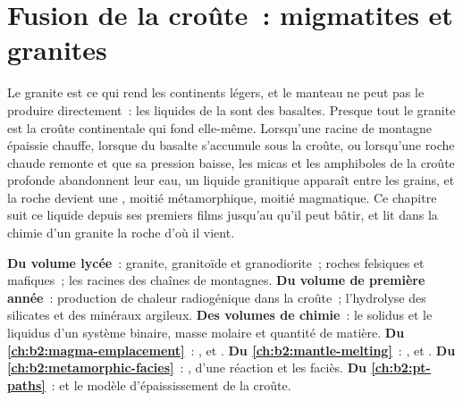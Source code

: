 \chapter{Fusion de la croûte~: migmatites et granites}\label{ch:b2:crustal-melting}

Le granite est ce qui rend les continents légers, et le manteau ne peut pas le
produire directement~: les liquides de la  sont des basaltes. Presque tout
le granite est la croûte continentale qui fond elle-même. Lorsqu'une racine de montagne
épaissie chauffe, lorsque du basalte s'accumule sous la croûte, ou lorsqu'une roche chaude
remonte et que sa pression baisse, les micas et les amphiboles de la croûte profonde
abandonnent leur eau, un liquide granitique apparaît entre les grains, et la roche devient
une , moitié métamorphique, moitié magmatique. Ce chapitre suit ce liquide depuis
ses premiers films jusqu'au  qu'il peut bâtir, et lit dans la chimie d'un granite la roche d'où il vient.

\begin{recall}
\textbf{Du volume lycée}~: granite, granitoïde et granodiorite~; roches felsiques et mafiques~;
les racines des chaînes de montagnes. \textbf{Du volume de première année}~: production de chaleur radiogénique dans la croûte~;
l'hydrolyse des silicates et des minéraux argileux. \textbf{Des volumes de chimie}~: le solidus et le liquidus d'un système binaire,
masse molaire et quantité de matière. \textbf{Du
\cref{ch:b2:magma-emplacement}}~: ,  et . \textbf{Du
\cref{ch:b2:mantle-melting}}~: ,  et . \textbf{Du \cref{ch:b2:metamorphic-facies}}~: ,  d'une
réaction et les faciès. \textbf{Du \cref{ch:b2:pt-paths}}~:  et le
modèle d'épaississement de la croûte.
\end{recall}

